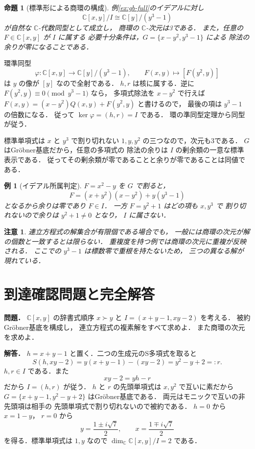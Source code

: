 \documentclass[a5paper,10pt,onecolumn]{jsarticle}
\makeatletter
\theoremstyle{mathnotetheorem}
\newtheorem{proposition}[theorem]{命題}
\newtheorem{example}[theorem]{例}
\newtheorem{remark}[theorem]{注意}
\renewcommand{\proofname}{証明}
\renewenvironment{proof}[1][\proofname]{%
  \par\pushQED{\qed}\normalfont\topsep4\p@\@plus2\p@\relax
  \trivlist\item[\hskip\labelsep\bfseries #1]\ignorespaces
}{\popQED\endtrivlist\@endpefalse}
\makeatother
\begin{document}
\begin{proposition}[標準形による商環の構成]\label{prop:gb-quotient}
例\ref{ex:gb-full}のイデアルに対し
\[
 \mathbb C[x,y]/I
 \cong\mathbb C[y]/(y^3-1)
\]
が自然な $\mathbb C$-代数同型として成立し，
商環の $\mathbb C$-次元は3である．
また，任意の $F\in\mathbb C[x,y]$ が $I$ に属する
必要十分条件は，$G=\{x-y^2,y^3-1\}$ による
除法の余りが零になることである．
\end{proposition}
\begin{proof}
環準同型
\[
 \varphi:\mathbb C[x,y]\longrightarrow
         \mathbb C[y]/(y^3-1),
 \qquad F(x,y)\longmapsto[F(y^2,y)]
\]
は $y$ の像が $[y]$ なので全射である．
$h,r$ は核に属する．逆に
$F(y^2,y)\equiv0\pmod{y^3-1}$ なら，
多項式除法を $x-y^2$ で行えば
$F(x,y)=(x-y^2)Q(x,y)+F(y^2,y)$ と書けるので，
最後の項は $y^3-1$ の倍数になる．
従って $\ker\varphi=(h,r)=I$ である．
環の準同型定理から同型が従う．

標準単項式は $x$ と $y^3$ で割り切れない
$1,y,y^2$ の三つなので，次元も3である．
$G$ はGr\"obner基底だから，任意の多項式の
除法の余りは $I$ の剰余類の一意な標準表示である．
従ってその剰余類が零であることと余りが零であることは同値である．
\end{proof}
\begin{example}[イデアル所属判定]
$F=x^2-y$ を $G$ で割ると，
\[
 F=(x+y^2)(x-y^2)+y(y^3-1)
\]
となるから余りは零であり $F\in I$．
一方 $F=y^2+1$ はどの項も $x,y^3$ で
割り切れないので余りは $y^2+1\ne0$ となり，
$I$ に属さない．
\end{example}
\begin{remark}
連立方程式の解集合が有限個である場合でも，
一般には商環の次元が解の個数と一致するとは限らない．
重複度を持つ例では商環の次元に重複が反映される．
ここでの $y^3-1$ は標数零で重根を持たないため，
三つの異なる解が現れている．
\end{remark}

\section*{到達確認問題と完全解答}
\noindent\textbf{問題．}
$\mathbb C[x,y]$ の辞書式順序 $x\succ y$ と
$I=(x+y-1,xy-2)$ を考える．
被約Gr\"obner基底を構成し，
連立方程式の複素解をすべて求めよ．
また商環の次元を求めよ．

\medskip\noindent\textbf{解答．}
$h=x+y-1$ と置く．二つの生成元のS多項式を取ると
\[
 S(h,xy-2)=y(x+y-1)-(xy-2)=y^2-y+2=:r.
\]
$h,r\in I$ である．また
\[
 xy-2=yh-r
\]
だから $I=(h,r)$ が従う．
$h$ と $r$ の先頭単項式は $x,y^2$ で互いに素だから
$G=\{x+y-1,y^2-y+2\}$ はGr\"obner基底である．
両元はモニックで互いの非先頭項は相手の
先頭単項式で割り切れないので被約である．
$h=0$ から $x=1-y$，
$r=0$ から
\[
 y=\frac{1\pm i\sqrt7}{2},\qquad
 x=\frac{1\mp i\sqrt7}{2}
\]
を得る．標準単項式は $1,y$ なので
$\dim_{\mathbb C}\mathbb C[x,y]/I=2$ である．
\end{document}
